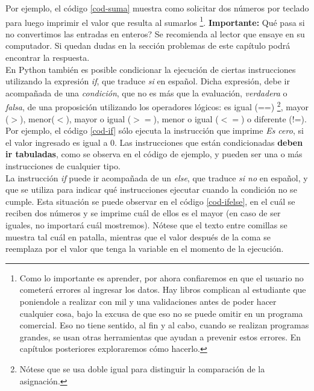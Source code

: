  Por ejemplo, el código \ref{cod-suma} muestra como solicitar dos números por teclado para luego imprimir el valor que resulta al sumarlos \footnote{Como lo importante es aprender, por ahora confiaremos en que el usuario no cometerá errores al ingresar los datos. Hay libros complican al estudiante que poniendole a realizar con mil y una validaciones antes de poder hacer cualquier cosa, bajo la excusa de que eso no se puede omitir en un programa comercial. Eso no tiene sentido, al fin y al cabo, cuando se realizan programas grandes, se usan otras herramientas que ayudan a prevenir estos errores. En capítulos posteriores exploraremos cómo hacerlo.}. \textbf{Importante:} Qué pasa si no convertimos las entradas en enteros? Se recomienda al lector que ensaye en su computador. Si quedan dudas en la sección problemas de este capítulo podrá encontrar la respuesta. \\



En Python también es posible condicionar la ejecución de ciertas instrucciones utilizando la expresión \emph{if}, que traduce \emph{si} en español. Dicha expresión, debe ir acompañada de una \emph{condición}, que no es más que la evaluación, \emph{verdadera} o \emph{falsa}, de una proposición utilizando los operadores lógicos: es igual (==) \footnote{Nótese que se usa doble igual para distinguir la comparación de la asignación.}, mayor ($>$), menor($<$), mayor o igual ($>=$), menor o igual ($<=$) o diferente (!=). Por ejemplo, el código \ref{cod-if} sólo ejecuta la instrucción que imprime \emph{Es cero}, si  el valor ingresado es igual a 0. Las instrucciones que están condicionadas \textbf{deben ir tabuladas}, como se observa en el código de ejemplo, y pueden ser una o más instrucciones de cualquier tipo. \\




La instrucción \emph{if} puede ir acompañada de un \emph{else}, que traduce \emph{si no} en español, y que se utiliza para indicar qué instrucciones ejecutar cuando la condición no se cumple. Esta situación se puede observar en el código \ref{cod-ifelse}, en el cuál se reciben dos números y se imprime cuál de ellos es el mayor (en caso de ser iguales, no importará cuál mostremos). Nótese que el texto entre comillas se muestra tal cuál en patalla, mientras que el valor después de la coma se reemplaza por el valor que tenga la variable en el momento de la ejecución. \\

